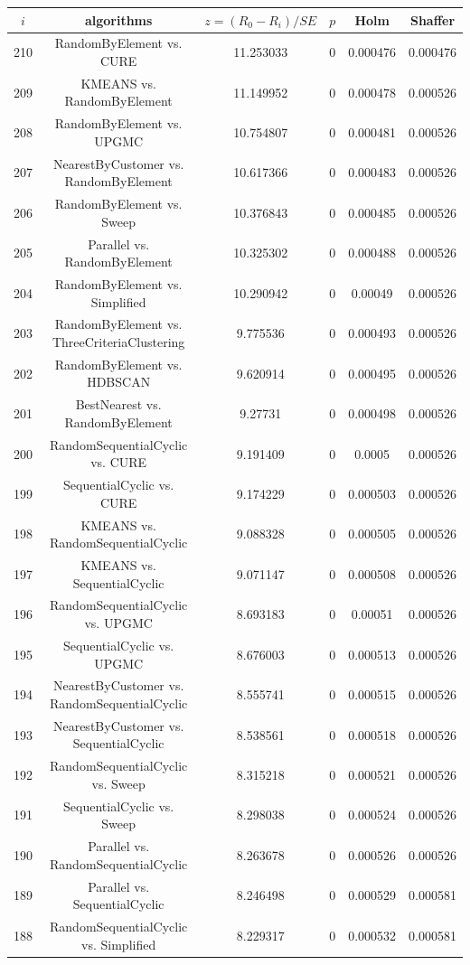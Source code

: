 \documentclass[a4paper,10pt]{article}
\begin{document}
\begin{landscape}
\begin{table}[!htp]
\centering\scriptsize
\begin{tabular}{cccccc}
$i$&algorithms&$z=(R_0 - R_i)/SE$&$p$&Holm&Shaffer\\
\hline210&RandomByElement vs. CURE&11.253033&0&0.000476&0.000476\\
209&KMEANS vs. RandomByElement&11.149952&0&0.000478&0.000526\\
208&RandomByElement vs. UPGMC&10.754807&0&0.000481&0.000526\\
207&NearestByCustomer vs. RandomByElement&10.617366&0&0.000483&0.000526\\
206&RandomByElement vs. Sweep&10.376843&0&0.000485&0.000526\\
205&Parallel vs. RandomByElement&10.325302&0&0.000488&0.000526\\
204&RandomByElement vs. Simplified&10.290942&0&0.00049&0.000526\\
203&RandomByElement vs. ThreeCriteriaClustering&9.775536&0&0.000493&0.000526\\
202&RandomByElement vs. HDBSCAN&9.620914&0&0.000495&0.000526\\
201&BestNearest vs. RandomByElement&9.27731&0&0.000498&0.000526\\
200&RandomSequentialCyclic vs. CURE&9.191409&0&0.0005&0.000526\\
199&SequentialCyclic vs. CURE&9.174229&0&0.000503&0.000526\\
198&KMEANS vs. RandomSequentialCyclic&9.088328&0&0.000505&0.000526\\
197&KMEANS vs. SequentialCyclic&9.071147&0&0.000508&0.000526\\
196&RandomSequentialCyclic vs. UPGMC&8.693183&0&0.00051&0.000526\\
195&SequentialCyclic vs. UPGMC&8.676003&0&0.000513&0.000526\\
194&NearestByCustomer vs. RandomSequentialCyclic&8.555741&0&0.000515&0.000526\\
193&NearestByCustomer vs. SequentialCyclic&8.538561&0&0.000518&0.000526\\
192&RandomSequentialCyclic vs. Sweep&8.315218&0&0.000521&0.000526\\
191&SequentialCyclic vs. Sweep&8.298038&0&0.000524&0.000526\\
190&Parallel vs. RandomSequentialCyclic&8.263678&0&0.000526&0.000526\\
189&Parallel vs. SequentialCyclic&8.246498&0&0.000529&0.000581\\
188&RandomSequentialCyclic vs. Simplified&8.229317&0&0.000532&0.000581\\

\end{tabular}
\end{table}
\end{landscape}
\end{document}
